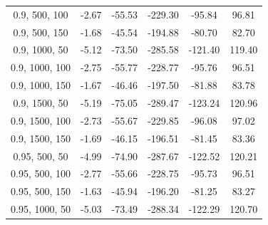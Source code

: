 \documentclass[
]{article}
\begin{document}
\begin{table}[H]
{\begin{tabular}{|c|c|c|c|c|c|}
                0.9, 500, 100              & -2.67                      & -55.53                     & -229.30                    & -95.84                   & 96.81                   \\
                0.9, 500, 150              & -1.68                      & -45.54                     & -194.88                    & -80.70                   & 82.70                   \\
                0.9, 1000, 50              & -5.12                      & -73.50                     & -285.58                    & -121.40                  & 119.40                  \\
                0.9, 1000, 100             & -2.75                      & -55.77                     & -228.77                    & -95.76                   & 96.51                   \\
                0.9, 1000, 150             & -1.67                      & -46.46                     & -197.50                    & -81.88                   & 83.78                   \\
                0.9, 1500, 50              & -5.19                      & -75.05                     & -289.47                    & -123.24                  & 120.96                  \\
                0.9, 1500, 100             & -2.73                      & -55.67                     & -229.85                    & -96.08                   & 97.02                   \\
                0.9, 1500, 150             & -1.69                      & -46.15                     & -196.51                    & -81.45                   & 83.36                   \\
                0.95, 500, 50              & -4.99                      & -74.90                     & -287.67                    & -122.52                  & 120.21                  \\
                0.95, 500, 100             & -2.77                      & -55.66                     & -228.75                    & -95.73                   & 96.51                   \\
                0.95, 500, 150             & -1.63                      & -45.94                     & -196.20                    & -81.25                   & 83.27                   \\
                0.95, 1000, 50             & -5.03                      & -73.49                     & -288.34                    & -122.29                  & 120.70                  \\

\end{tabular}}
\end{table}
\end{document}

